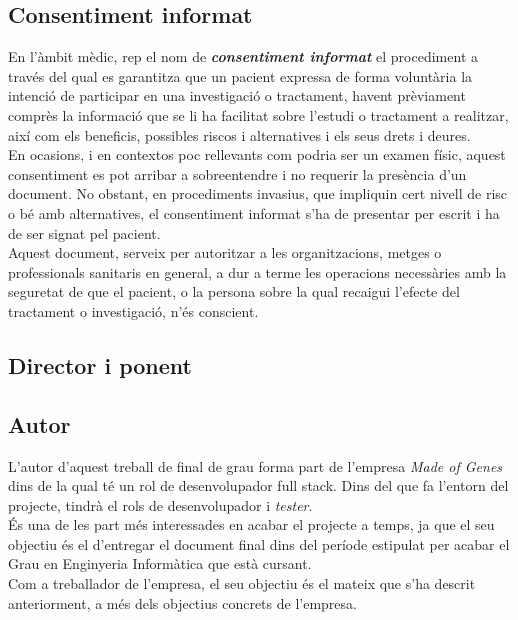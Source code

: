\subsection{Consentiment informat}
En l'àmbit mèdic, rep el nom de \textit{\textbf{consentiment informat}} el procediment a través del qual es garantitza que un pacient expressa de forma voluntària la intenció de participar en una investigació o tractament, havent prèviament comprès la informació que se li ha facilitat sobre l'estudi o tractament a realitzar, així com els beneficis, possibles riscos i alternatives i els seus drets i deures.\\
\newline En ocasions, i en contextos poc rellevants com podria ser un examen físic, aquest consentiment es pot arribar a sobreentendre i no requerir la presència d'un document. No obstant, en procediments invasius, que impliquin cert nivell de risc o bé amb alternatives, el consentiment informat s'ha de presentar per escrit i ha de ser signat pel pacient.\\
\newline Aquest document, serveix per autoritzar a les organitzacions, metges o professionals sanitaris en general, a dur a terme les operacions necessàries amb la seguretat de que el pacient, o la persona sobre la qual recaigui l'efecte del tractament o investigació, n'és conscient.

\subsection{Director i ponent}

\subsection{Autor}
L'autor d'aquest treball de final de grau forma part de l'empresa \textit{Made of Genes} dins de la qual té un rol de desenvolupador full stack.
Dins del que fa l'entorn del projecte, tindrà el rols de desenvolupador i \textit{tester}.\\
\newline És una de les part més interessades en acabar el projecte a temps, ja que el seu objectiu és el d'entregar el document final dins del període estipulat per acabar el Grau en Enginyeria Informàtica que està cursant.\\
\newline Com a treballador de l'empresa, el seu objectiu és el mateix que s'ha descrit anteriorment, a més dels objectius concrets de l'empresa.



